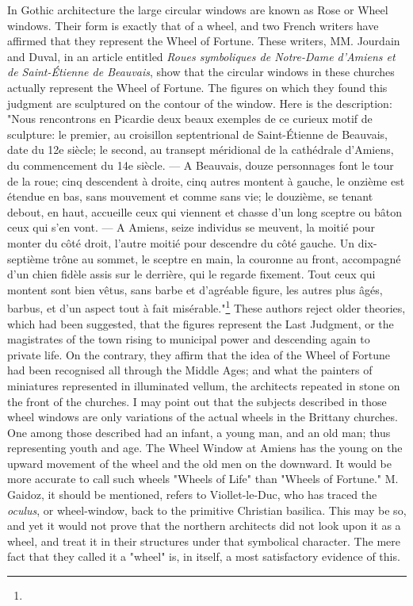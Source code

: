 \documentclass[a4paper, 11pt, oneside, polutonikogreek, english]{article}
\begin{document}
In Gothic architecture the large circular windows are known as Rose or Wheel windows. Their form is exactly that of a wheel, and two French writers have affirmed that they represent the Wheel of Fortune. These writers, MM. Jourdain and Duval, in an article entitled \emph{Roues symboliques de Notre-Dame d'Amiens et de Saint-Étienne de Beauvais}, show that the circular windows in these churches actually represent the Wheel of Fortune. The figures on which they found this judgment are sculptured on the contour of the window. Here is the description: "Nous rencontrons en Picardie deux beaux exemples de ce curieux motif de sculpture: le premier, au croisillon septentrional de Saint-Étienne de Beauvais, date du 12e siècle; le second, au transept méridional de la cathédrale d'Amiens, du commencement du 14e siècle. --- A Beauvais, douze personnages font le tour de la roue; cinq descendent à droite, cinq autres montent à gauche, le onzième est étendue en bas, sans mouvement et comme sans vie; le douzième, se tenant debout, en haut, accueille ceux qui viennent et chasse d'un long sceptre ou bâton ceux qui s'en vont. --- A Amiens, seize individus se meuvent, la moitié pour monter du côté droit, l'autre moitié pour descendre du côté gauche. Un dix-septième trône au sommet, le sceptre en main, la couronne au front, accompagné d'un chien fidèle assis sur le derrière, qui le regarde fixement. Tout ceux qui montent sont bien vêtus, sans barbe et d'agréable figure, les autres plus âgés, barbus, et d'un aspect tout à fait misérable."\footnote{} These authors reject older theories, which had been suggested, that the figures represent the Last Judgment, or the magistrates of the town rising to municipal power and descending again to private life. On the contrary, they affirm that the idea of the Wheel of Fortune had been recognised all through the Middle Ages; and what the painters of miniatures represented in illuminated vellum, the architects repeated in stone on the front of the churches. I may point out that the subjects described in those wheel windows are only variations of the actual wheels in the Brittany churches. One among those described had an infant, a young man, and an old man; thus representing youth and age. The Wheel Window at Amiens has the young on the upward movement of the wheel and the old men on the downward. It would be more accurate to call such wheels "Wheels of Life" than "Wheels of Fortune." M. Gaidoz, it should be mentioned, refers to Viollet-le-Duc, who has traced the \emph{oculus}, or wheel-window, back to the primitive Christian basilica. This may be so, and yet it would not prove that the northern architects did not look upon it as a wheel, and treat it in their structures under that symbolical character. The mere fact that they called it a "wheel" is, in itself, a most satisfactory evidence of this.
\end{document}
